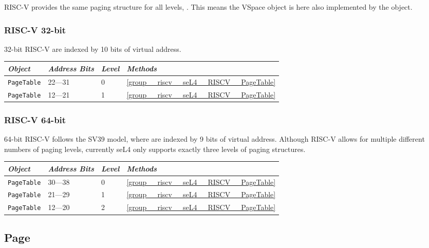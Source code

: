 RISC-V provides the same paging structure for all levels, . This means the VSpace
object is here also implemented by the  object.

\subsubsection{RISC-V 32-bit}

32-bit RISC-V  are indexed by 10 bits of virtual address.

\begin{tabularx}{\textwidth}{Xlll} \toprule
\emph{Object}          & \emph{Address Bits} & \emph{Level} & \emph{Methods} \\ \midrule
\texttt{PageTable}     & 22---31             & 0            & \autoref{group__riscv__seL4__RISCV__PageTable} \\
\texttt{PageTable}     & 12---21             & 1            & \autoref{group__riscv__seL4__RISCV__PageTable} \\
\bottomrule
\end{tabularx}

\subsubsection{RISC-V 64-bit}

64-bit RISC-V follows the SV39 model, where  are indexed by 9 bits of virtual address.
Although RISC-V allows
for multiple different numbers of paging levels, currently seL4 only supports exactly three levels
of paging structures.

\begin{tabularx}{\textwidth}{Xlll} \toprule
\emph{Object}          & \emph{Address Bits} & \emph{Level} & \emph{Methods} \\ \midrule
\texttt{PageTable}     & 30---38             & 0            & \autoref{group__riscv__seL4__RISCV__PageTable} \\
\texttt{PageTable}     & 21---29             & 1            & \autoref{group__riscv__seL4__RISCV__PageTable} \\
\texttt{PageTable}     & 12---20             & 2            & \autoref{group__riscv__seL4__RISCV__PageTable} \\
\bottomrule
\end{tabularx}

\subsection{Page}

